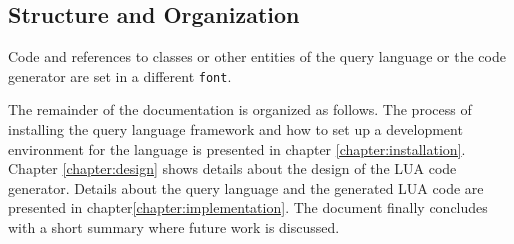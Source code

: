 \subsection{Structure and Organization}
Code and references to classes or other entities of the query language or the 
code generator are set in a different \texttt{font}.

The remainder of the documentation is organized as follows. The process 
of installing the query language framework and how to set up a development
environment for the language is presented in chapter \ref{chapter:installation}.
Chapter \ref{chapter:design} shows details about the design of the LUA code 
generator. Details about the query language and the generated LUA code are 
presented in chapter\ref{chapter:implementation}. The document finally concludes
with a short summary where future work is discussed. 


